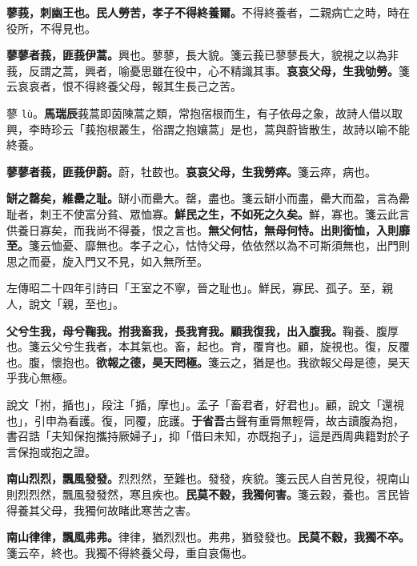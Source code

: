 \textbf{蓼莪，刺幽王也。民人勞苦，孝子不得終養爾。}{\footnotesize 不得終養者，二親病亡之時，時在役所，不得見也。}

\textbf{蓼蓼者莪，匪莪伊蒿。}{\footnotesize 興也。蓼蓼，長大貌。箋云莪已蓼蓼長大，貌視之以為非莪，反謂之蒿，興者，喻憂思雖在役中，心不精識其事。}\textbf{哀哀父母，生我劬勞。}{\footnotesize 箋云哀哀者，恨不得終養父母，報其生長己之苦。}

\begin{quoting}蓼 \texttt{lù}。\textbf{馬瑞辰}莪蒿即茵陳蒿之類，常抱宿根而生，有子依母之象，故詩人借以取興，李時珍云「莪抱根叢生，俗謂之抱孃蒿」是也，蒿與蔚皆散生，故詩以喻不能終養。\end{quoting}

\textbf{蓼蓼者莪，匪莪伊蔚。}{\footnotesize 蔚，牡菣也。}\textbf{哀哀父母，生我勞瘁。}{\footnotesize 箋云瘁，病也。}

\textbf{缾之罄矣，維罍之耻。}{\footnotesize 缾小而罍大。罄，盡也。箋云缾小而盡，罍大而盈，言為罍耻者，刺王不使富分貧、眾恤寡。}\textbf{鮮民之生，不如死之久矣。}{\footnotesize 鮮，寡也。箋云此言供養日寡矣，而我尚不得養，恨之言也。}\textbf{無父何怙，無母何恃。出則銜恤，入則靡至。}{\footnotesize 箋云恤憂、靡無也。孝子之心，怙恃父母，依依然以為不可斯須無也，出門則思之而憂，旋入門又不見，如入無所至。}

\begin{quoting}左傳昭二十四年引詩曰「王室之不寧，晉之耻也」。鮮民，寡民、孤子。至，親人，說文「親，至也」。\end{quoting}

\textbf{父兮生我，母兮鞠我。拊我畜我，長我育我。顧我復我，出入腹我。}{\footnotesize 鞠養、腹厚也。箋云父兮生我者，本其氣也。畜，起也。育，覆育也。顧，旋視也。復，反覆也。腹，懷抱也。}\textbf{欲報之德，昊天罔極。}{\footnotesize 箋云之，猶是也。我欲報父母是德，昊天乎我心無極。}

\begin{quoting}說文「拊，揗也」，段注「揗，摩也」。孟子「畜君者，好君也」。顧，說文「還視也」，引申為看護。復，同覆，庇護。\textbf{于省吾}古聲有重脣無輕脣，故古讀腹為抱，書召誥「夫知保抱攜持厥婦子」，抑「借曰未知，亦既抱子」，這是西周典籍對於子言保抱或抱之證。\end{quoting}

\textbf{南山烈烈，飄風發發。}{\footnotesize 烈烈然，至難也。發發，疾貌。箋云民人自苦見役，視南山則烈烈然，飄風發發然，寒且疾也。}\textbf{民莫不穀，我獨何害。}{\footnotesize 箋云穀，養也。言民皆得養其父母，我獨何故睹此寒苦之害。}

\textbf{南山律律，飄風弗弗。}{\footnotesize 律律，猶烈烈也。弗弗，猶發發也。}\textbf{民莫不穀，我獨不卒。}{\footnotesize 箋云卒，終也。我獨不得終養父母，重自哀傷也。}

